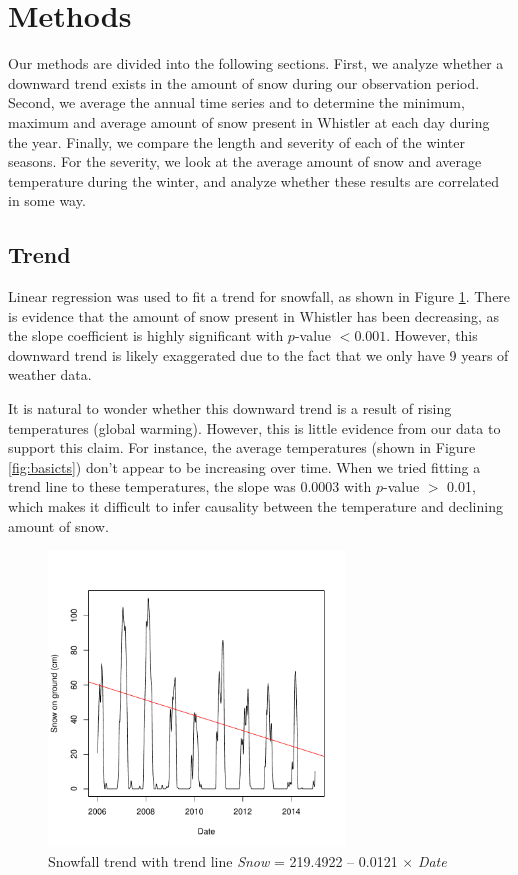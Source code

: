 \documentclass[12pt,twoside]{article}
\begin{document}
{\section{Methods}

Our methods are divided into the following sections. First, we analyze whether a downward trend exists in the amount of snow during our observation period. Second, we average the annual time series and to determine the minimum, maximum and average amount of snow present in Whistler at each day during the year. Finally, we compare the length and severity of each of the winter seasons. For the severity, we look at the average amount of snow and average temperature during the winter, and analyze whether these results are correlated in some way.

\subsection{Trend}

Linear regression was used to fit a trend for snowfall, as shown in Figure \ref{fig:snowtrend}. There is evidence that the amount of snow present in Whistler has been decreasing, as the slope coefficient is highly significant with $p$-value $< 0.001$. However, this downward trend is likely exaggerated due to the fact that we only have 9 years of weather data. 

It is natural to wonder whether this downward trend is a result of rising temperatures (global warming). However, this is little evidence from our data to support this claim. For instance, the average temperatures (shown in Figure \ref{fig:basicts}) don't appear to be increasing  over time. When we tried fitting a trend line to these temperatures, the slope was $0.0003$ with $p$-value $>$ 0.01, which makes it difficult to infer causality between the temperature and declining amount of snow.


\begin{figure}[!ht]
\begin{center}
\includegraphics[width=0.7\textwidth]{report-snowtrend}
\end{center}
\vspace{-5mm}
\caption{Snowfall trend with trend line \textsl{Snow} = 219.4922 -- 0.0121 $\times$ \textsl{Date}}
\label{fig:snowtrend}
\end{figure}

}
\end{document}
